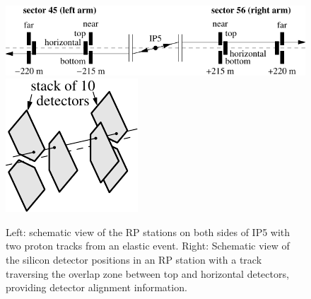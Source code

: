 \begin{figure}
\begin{center}
\includegraphics{fig/elastic_principle.pdf}
\hfil
\includegraphics{fig/stationScheme.pdf}
\caption{%
Left: schematic view of the RP stations on both sides of IP5 with two proton tracks from an elastic event. Right: Schematic view of the silicon detector positions in an RP station with a track traversing the overlap zone between top and horizontal detectors, providing detector alignment information. 
}
\label{fig:rpsketch}
\end{center}
\end{figure}
